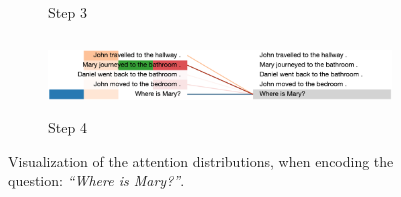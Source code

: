\begin{figure}[!ht]
\begin{minipage}{\textwidth}
\begin{subfigure}[t]{\textwidth}
        \caption{Step 3}
    \end{subfigure}
    \hfill \hfill 
    \begin{subfigure}[t]{\textwidth}
        \centering
        \includegraphics[height=0.8in]{04-part-03/chapter-06/figs_and_tables/figs_attention_babi/e1-step4}
        \caption{Step 4}
    \end{subfigure}
\end{minipage}
    \caption{\label{fig:ex1}Visualization of the attention distributions, when encoding the question: \emph{``Where is Mary?''}.}
\end{figure}
\afterpage{\clearpage}




